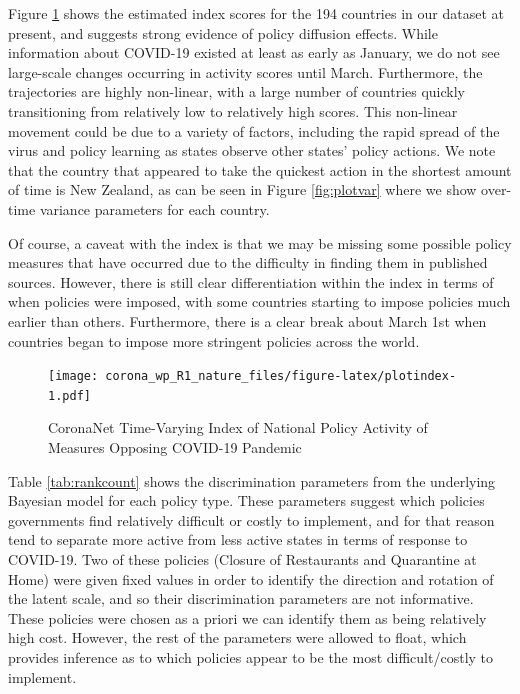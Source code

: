 \documentclass[
]{article}
\begin{document}
Figure \ref{fig:plotindex} shows the estimated index scores for the 194 countries in our dataset at present, and suggests strong evidence of policy diffusion effects. While information about COVID-19 existed at least as early as January, we do not see large-scale changes occurring in activity scores until March. Furthermore, the trajectories are highly non-linear, with a large number of countries quickly transitioning from relatively low to relatively high scores. This non-linear movement could be due to a variety of factors, including the rapid spread of the virus and policy learning as states observe other states' policy actions. We note that the country that appeared to take the quickest action in the shortest amount of time is New Zealand, as can be seen in Figure \ref{fig:plotvar} where we show over-time variance parameters for each country.

Of course, a caveat with the index is that we may be missing some possible policy measures that have occurred due to the difficulty in finding them in published sources. However, there is still clear differentiation within the index in terms of when policies were imposed, with some countries starting to impose policies much earlier than others. Furthermore, there is a clear break about March 1st when countries began to impose more stringent policies across the world.

\begin{figure}
\centering
\texttt{[image: corona\_wp\_R1\_nature\_files/figure-latex/plotindex-1.pdf]}
\caption{\label{fig:plotindex}CoronaNet Time-Varying Index of National Policy Activity of Measures Opposing COVID-19 Pandemic}
\end{figure}

Table \ref{tab:rankcount} shows the discrimination parameters from the underlying Bayesian model for each policy type. These parameters suggest which policies governments find relatively difficult or costly to implement, and for that reason tend to separate more active from less active states in terms of response to COVID-19. Two of these policies (Closure of Restaurants and Quarantine at Home) were given fixed values in order to identify the direction and rotation of the latent scale, and so their discrimination parameters are not informative. These policies were chosen as a priori we can identify them as being relatively high cost. However, the rest of the parameters were allowed to float, which provides inference as to which policies appear to be the most difficult/costly to implement.
\end{document}
